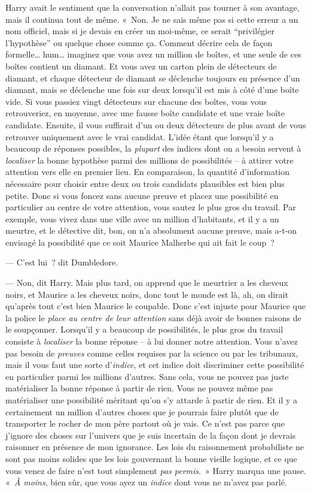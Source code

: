 Harry avait le sentiment que la conversation n'allait pas tourner à son avantage, mais il continua tout de même.
«~Non. Je ne sais même pas si cette erreur a un nom officiel, mais si je devais en créer un moi-même, ce serait “privilégier l'hypothèse” ou quelque chose comme ça.
Comment décrire cela de façon formelle… hum… imaginez que vous avez un million de boîtes, et une seule de ces boîtes contient un diamant.
Et vous avez un carton plein de détecteurs de diamant, et chaque détecteur de diamant se déclenche toujours en présence d'un diamant, mais se déclenche une fois sur deux lorsqu'il est mis à côté d'une boîte vide.
Si vous passiez vingt détecteurs sur chacune des boîtes, vous vous retrouveriez, en moyenne, avec une fausse boîte candidate et une vraie boîte candidate.
Ensuite, il vous suffirait d'un ou deux détecteurs de plus avant de vous retrouver uniquement avec le vrai candidat.
L'idée étant que lorsqu'il y a beaucoup de réponses possibles, la \emph{plupart} des indices dont on a besoin servent à \emph{localiser} la bonne hypothèse parmi des millions de possibilités -- à attirer votre attention vers elle en premier lieu.
En comparaison, la quantité d'information nécessaire pour choisir entre deux ou trois candidats plausibles est bien plus petite.
Donc si vous foncez sans aucune preuve et placez une possibilité en particulier au centre de votre attention, vous sautez le plus gros du travail.
Par exemple, vous vivez dans une ville avec un million d'habitants, et il y a un meurtre, et le détective dit, bon, on n'a absolument aucune preuve, mais a-t-on envisagé la possibilité que ce soit Maurice Malherbe qui ait fait le coup~?

--- C'est lui~? dit Dumbledore.

--- Non, dit Harry.
Mais plus tard, on apprend que le meurtrier a les cheveux noirs, et Maurice a les cheveux noirs, donc tout le monde est là, ah, on dirait qu'après tout c'est bien Maurice le coupable.
Donc c'est injuste pour Maurice que la police le \emph{place au centre de leur attention} sans déjà avoir de bonnes raisons de le soupçonner.
Lorsqu'il y a beaucoup de possibilités, le plus gros du travail consiste à \emph{localiser} la bonne réponse -- à lui donner notre attention.
Vous n'avez pas besoin de \emph{preuves} comme celles requises par la science ou par les tribunaux, mais il vous faut une sorte d'\emph{indice}, et cet indice doit discriminer cette possibilité en particulier parmi les millions d'autres.
Sans cela, vous ne pouvez pas juste matérialiser la bonne réponse à partir de rien.
Vous ne pouvez même pas matérialiser une possibilité méritant qu'on s'y attarde à partir de rien.
Et il y a certainement un million d'autres choses que je pourrais faire plutôt que de transporter le rocher de mon père partout où je vais.
Ce n'est pas parce que j'ignore des choses sur l'univers que je suis incertain de la façon dont je devrais raisonner en présence de mon ignorance.
Les lois du raisonnement probabiliste ne sont pas moins solides que les lois gouvernant la bonne vieille logique, et ce que vous venez de faire n'est tout simplement \emph{pas permis}.~»
Harry marqua une pause.
«~\emph{À moins}, bien sûr, que vous ayez un \emph{indice} dont vous ne m'avez pas parlé.

